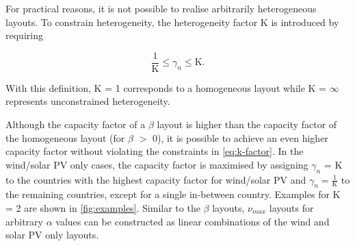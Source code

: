 \documentclass[a4paper, 5p, sort&compress]{elsarticle}%
\begin{document}

For practical reasons, it is not possible to realise arbitrarily
heterogeneous layouts. To constrain heterogeneity, the heterogeneity
factor K is introduced by requiring

\begin{equation}
  \label{eq:k-factor}
  \frac{1}{\text{K}} \leq \gamma_{n} \leq \text{K} .
\end{equation}

With this definition, K = 1 corresponds to a homogeneous layout while
K = $\infty$ represents unconstrained heterogeneity.

Although the capacity factor of a $\beta$ layout is higher than the
capacity factor of the homogeneous layout (for $\beta$ $>$ 0), it is
possible to achieve an even higher capacity factor without violating
the constraints in \cref{eq:k-factor}. In the wind/solar PV only
cases, the capacity factor is maximised by assigning $\gamma_{n}$ = K to
the countries with the highest capacity factor for wind/solar PV and
$\gamma_{n} = \frac{1}{\text{K}}$ to the remaining countries, except for a
single in-between country. Examples for K = 2 are shown in
\cref{fig:examples}. Similar to the $\beta$ layouts, $\nu_{max}$ layouts for
arbitrary $\alpha$ values can be constructed as linear combinations of the
wind and solar PV only layouts.
\end{document}
